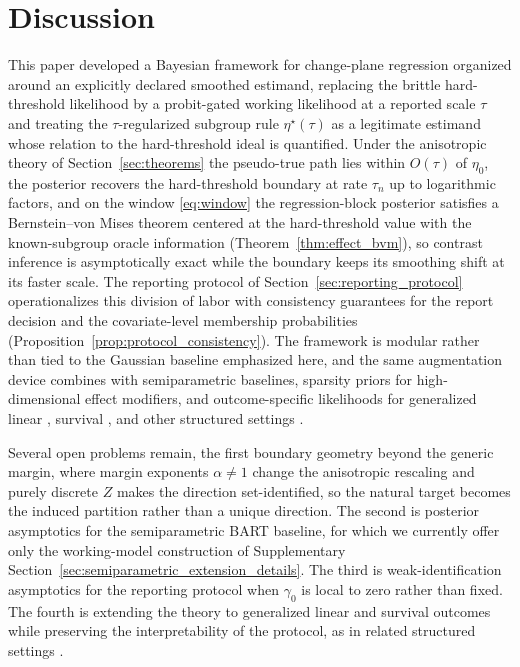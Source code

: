 \documentclass[11pt]{article}
\theoremstyle{definition}
\theoremstyle{plain}
\begin{document}
\section{Discussion}
\label{sec:conclusion}
This paper developed a Bayesian framework for change-plane regression organized around an explicitly declared smoothed estimand, replacing the brittle hard-threshold likelihood by a probit-gated working likelihood at a reported scale $\tau$ and treating the $\tau$-regularized subgroup rule $\eta^\star(\tau)$ as a legitimate estimand whose relation to the hard-threshold ideal is quantified. Under the anisotropic theory of Section~\ref{sec:theorems} the pseudo-true path lies within $O(\tau)$ of $\eta_0$, the posterior recovers the hard-threshold boundary at rate $\tau_n$ up to logarithmic factors, and on the window \eqref{eq:window} the regression-block posterior satisfies a Bernstein--von Mises theorem centered at the hard-threshold value with the known-subgroup oracle information (Theorem~\ref{thm:effect_bvm}), so contrast inference is asymptotically exact while the boundary keeps its smoothing shift at its faster scale. The reporting protocol of Section~\ref{sec:reporting_protocol} operationalizes this division of labor with consistency guarantees for the report decision and the covariate-level membership probabilities (Proposition~\ref{prop:protocol_consistency}). The framework is modular rather than tied to the Gaussian baseline emphasized here, and the same augmentation device combines with semiparametric baselines, sparsity priors for high-dimensional effect modifiers, and outcome-specific likelihoods for generalized linear \citep{Huang2021}, survival \citep{Wei2018}, and other structured settings \citep[e.g.,][]{Zhang2022}.

Several open problems remain, the first boundary geometry beyond the generic margin, where margin exponents $\alpha\neq1$ change the anisotropic rescaling and purely discrete $Z$ makes the direction set-identified, so the natural target becomes the induced partition rather than a unique direction. The second is posterior asymptotics for the semiparametric BART baseline, for which we currently offer only the working-model construction of Supplementary Section~\ref{sec:semiparametric_extension_details}. The third is weak-identification asymptotics for the reporting protocol when $\gamma_0$ is local to zero rather than fixed. The fourth is extending the theory to generalized linear \citep{Huang2021} and survival \citep{Wei2018} outcomes while preserving the interpretability of the protocol, as in related structured settings \citep{Zhang2022}.
\end{document}
